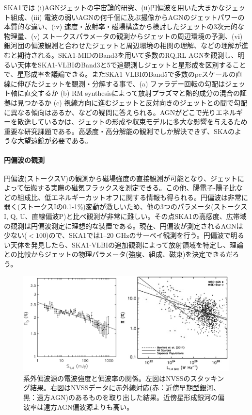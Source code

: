 SKA1では (i)AGNジェットの宇宙論的研究、(ii)円偏波を用いた大まかなジェット組成、(iii) 電波の弱いAGNの何千個に及ぶ撮像からAGNのジェットパワーの本質的な違い、(iv) 速度・放射率・磁場構造から検討したジェットの3次元的な物理量、(v) ストークスパラメータの観測からジェットの周辺環境の予測、(vi) 銀河団の偏波観測と合わせたジェットと周辺環境の相関の理解、などの理解が進むと期待される。SKA1-MIDのBand3を用いて多数のRQ,RL AGNを観測し、明るい天体をSKA1-VLBIのBand3と5で追観測しジェットと星形成を区別することで、星形成率を議論できる。またSKA1-VLBIのBand5で多数のpcスケールの直線に伸びたジェットを観測・分解する事で、(a) ファラデー回転の勾配はジェット軸に直交するか (b) RM synthesisによって放射プラズマと熱的成分の混合の証拠は見つかるか (c) 視線方向に進むジェットと反対向きのジェットとの間で勾配に異なる傾向はあるか、などの疑問に答えられる。AGNがどこで光りエネルギーを散逸しているかは、ジェットの形成や収束モデルに多大な影響を与えるため重要な研究課題である。高感度・高分解能の観測でしか解決できず、SKAのような大望遠鏡が必要である。

\paragraph{円偏波の観測}

円偏波(ストークスV)の観測から磁場強度の直接観測が可能となり、ジェットによって伝搬する実際の磁気フラックスを測定できる。この他、陽電子-陽子比などの組成比、低エネルギーカットオフに関する情報も得られる。円偏波は非常に弱く(ストークスIの0.1-1\%)変動が激しいため、他の3つのパラメータ(ストークスI, Q, U、直線偏波P)と比べ観測が非常に難しい。その点SKA1の高感度、広帯域の観測は円偏波測定に理想的な装置である。現在、円偏波が測定されるAGNは少ない($<100$)ので、SKA1では1--20 GHzのサーベイ観測を行う。円偏波で明るい天体を発見したら、SKA1-VLBIの追加観測によって放射領域を特定し、理論との比較からジェットの物理パラメータ(強度、組成、磁束)を決定できるだろう。

\begin{figure}[tbp]
\begin{center}
\includegraphics[width=0.9\linewidth]{magnetism/c06.s2.ss4.f1.eps}
\end{center}
\caption{
系外偏波源の電波強度と偏波率の関係。左図はNVSSのスタッキング結果\citep{2014ApJ...787...99S}。右図はNVSSデータに赤外線対応(赤：近傍早期型銀河、黒：遠方AGN)のあるものを取り出した結果\citep{1404.1638}。近傍星形成銀河の偏波率は遠方AGN偏波源よりも高い。
}\label{c06.s2.ss4.f1}
\end{figure}

